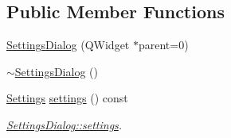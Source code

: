 \subsection*{Public Member Functions}
\begin{DoxyCompactItemize}
\item 
\mbox{\hyperlink{class_settings_dialog_a9933956b777b2c0451e9119581cc22fb}{Settings\+Dialog}} (Q\+Widget $\ast$parent=0)
\item 
\mbox{\hyperlink{class_settings_dialog_ac48f54d4472902be0a3845a69167f068}{$\sim$\+Settings\+Dialog}} ()
\item 
\mbox{\hyperlink{struct_settings_dialog_1_1_settings}{Settings}} \mbox{\hyperlink{class_settings_dialog_aaffeca2603f381c3b7db7c8c934599fb}{settings}} () const
\begin{DoxyCompactList}\small\item\em \mbox{\hyperlink{class_settings_dialog_aaffeca2603f381c3b7db7c8c934599fb}{Settings\+Dialog\+::settings}}. \end{DoxyCompactList}\end{DoxyCompactItemize}
